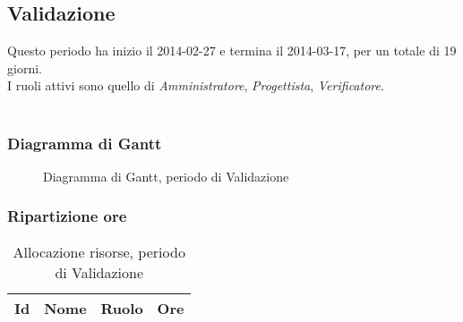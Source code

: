 	
	\subsection{Validazione}
	
Questo periodo ha inizio il 2014-02-27 e termina il 2014-03-17, per un totale di 19 giorni. \\
I ruoli attivi sono quello di \textit{Amministratore}, \textit{Progettista}, \textit{Verificatore}. \\ \\

\subsubsection{Diagramma di Gantt}

\begin{figure}[H]
\centering

	

\caption{Diagramma di Gantt, periodo di Validazione}
\end{figure}

\subsubsection{Ripartizione ore}

\begin{table}[H]
\begin{adjustwidth}{-4cm}{-4cm}
	\centering
	\begin{tabular}{ l l l c  }
	\hline
	\multicolumn{1}{c}{\textbf{Id}} & 
	\multicolumn{1}{c}{\textbf{Nome}} & 
	\multicolumn{1}{c}{\textbf{Ruolo}}& 
	\multicolumn{1}{c}{\textbf{Ore}} \\
	\hline
	
		

	\end{tabular}
	\caption{Allocazione risorse, periodo di Validazione}
\end{adjustwidth}
\end{table}	
	
	
